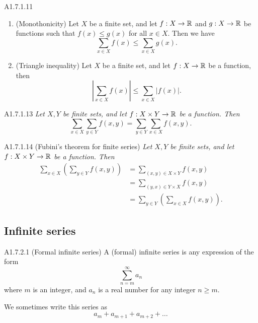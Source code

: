 \begin{proposition}{A1.7.1.11}
{\begin{enumerate}
        be a function, and let $c$ be a real number. Then
        \begin{equation*}
            \sum_{x \in X} cf(x) = c \sum_{x \in X} f(x).
        \end{equation*}
        \item (Monothonicity) Let $X$ be a finite set, and let $f: X \rightarrow \mathbb{R}$
        and $g: X \rightarrow \mathbb{R}$ be functions such that $f(x) \leq g(x)$ for all
        $x \in X$. Then we have
        \begin{equation*}
            \sum_{x \in X} f(x) \leq \sum_{x \in X} g(x).
        \end{equation*}
        \item (Triangle inequality) Let $X$ be a finite set, and let $f: X \rightarrow \mathbb{R}$
        be a function, then
        \begin{equation*}
            |\sum_{x \in X} f(x)| \leq \sum_{x \in X} |f(x)|.
        \end{equation*}
    \end{enumerate}}
\end{proposition}

\begin{lemma}{A1.7.1.13}
    \emph{Let $X, Y$ be finite sets, and let $f: X \times Y \rightarrow \mathbb{R}$
    be a function. Then
    \begin{equation*}
        \sum_{x \in X} \sum_{y \in Y} f(x, y) = \sum_{y \in Y} \sum_{x \in X} f(x, y).
    \end{equation*}}
\end{lemma}

\begin{corollary}{A1.7.1.14}
    (Fubini's theorem for finite series) \emph{Let $X, Y$ be finite sets, and let
    $f: X \times Y \rightarrow \mathbb{R}$ be a function. Then
    \begin{align*}
        \sum_{x \in X} (\sum_{y \in Y} f(x, y)) &= \sum_{(x, y) \in X \times Y} f(x, y) \\
        &= \sum_{(y, x) \in Y \times X} f(x, y) \\
        &= \sum_{y \in Y} (\sum_{x \in X} f(x, y)).
    \end{align*}}
\end{corollary}

\subsection{Infinite series}
\begin{definition}{A1.7.2.1}
    (Formal infinite series) A (formal) infinite series is any expression of the
    form
    \begin{equation*}
        \sum_{n=m}^{\infty} a_n
    \end{equation*}
    where $m$ is an integer, and $a_n$ is a real number for any integer $n \geq m$.

    We sometimes write this series as
    \begin{equation*}
        a_m + a_{m+1} + a_{m+2} + \ldots
    \end{equation*}
\end{definition}

